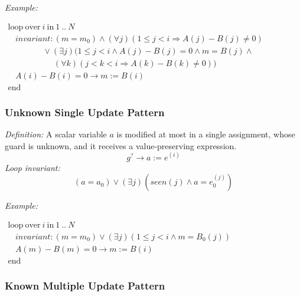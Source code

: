 \documentclass[a4paper,10pt]{article}
\newcommand{\idx}{\ensuremath{i}\xspace}
\newcommand{\at}[1]{{(#1)}}
\newcommand{\KWloop}{\ensuremath{\mathrm{loop}~}}
\newcommand{\KWend}{\ensuremath{\mathrm{end}~}}
\newcommand{\KWover}{\ensuremath{\mathrm{over}~}}
\newcommand{\KWin}{\ensuremath{~\mathrm{in}~}}
\newcommand{\impl}{\ensuremath{\Longrightarrow}}
\newcommand{\seen}[1]{\ensuremath{\mathit{seen}(#1)}\xspace}
\newcommand{\loopinvariant}{\noindent\textit{Loop invariant:}\xspace}
\newcommand{\patterndef}{\noindent\textit{Definition:}\xspace}
\newcommand{\patternexample}{\noindent\textit{Example:}\xspace}
\begin{document}
\bigskip
\patternexample

\medskip
$\begin{array}{l}
  \KWloop \KWover i \KWin 1~..~N \\
  ~~~~ \textit{invariant}: (m = m_0) \land (\forall j)(1\leq j < i \impl A(j)-B(j)\neq0)\\
  ~~~~~~~~~~~~~~~~~~~ \lor (\exists j)(1\leq j < i \land A(j)-B(j)= 0 \land m = B(j) \land \\
  ~~~~~~~~~~~~~~~~~~~~~~~~~ (\forall k)(j < k < i \impl A(k)-B(k)\neq0))\\
  ~~~~ A(i)-B(i)=0 \rightarrow m := B(i)\\
  \KWend
\end{array}$

\subsubsection*{Unknown Single Update Pattern}

\patterndef A scalar variable $a$ is modified at most in a single assignment, whose
guard is unknown, and it receives a value-preserving expression.
%
$$g^? \rightarrow a := e^\at{\idx}$$
%
\loopinvariant
%
$$(a = a_0) \lor (\exists j)(\seen{j} \land a = e_0^\at{j})$$

\bigskip
\patternexample

\medskip
$\begin{array}{l}
  \KWloop \KWover i \KWin 1~..~N \\
  ~~~~ \textit{invariant}: (m = m_0) \lor (\exists j)(1\leq j < i \land m = B_0(j))\\
  ~~~~ A(m)-B(m)=0 \rightarrow m := B(i)\\
  \KWend
\end{array}$

\subsubsection*{Known Multiple Update Pattern}
\end{document}
